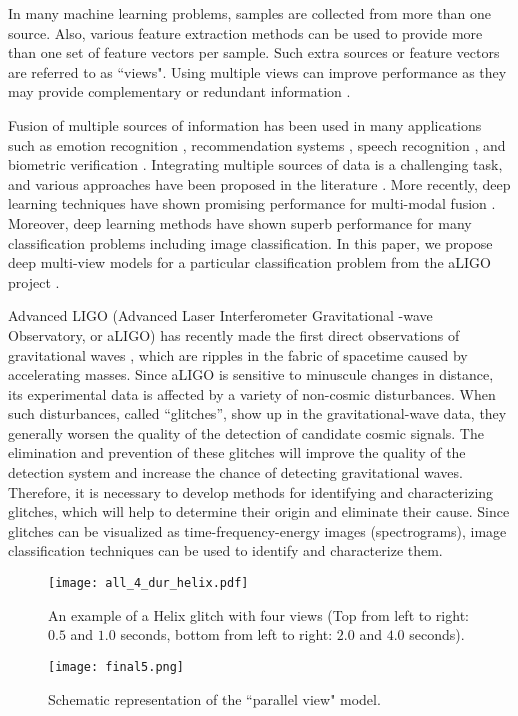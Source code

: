 \documentclass{article}
\begin{document}
In many machine learning problems, samples are collected from more than one source. Also, various feature extraction methods can be used to provide more than one set of feature vectors per sample. Such extra sources or feature vectors are referred to as ``views". Using multiple views can improve performance as they may provide complementary or redundant information \cite{xu2013survey}. 


Fusion of multiple sources of information has been used in many applications such as emotion recognition \cite{huang2016multi}, recommendation systems \cite{vahidrecomm}, speech recognition \cite{saraieee,bahaadini2014posterior}, and biometric verification \cite{aleksic2003audio}.
Integrating multiple sources of data is a challenging task, and various approaches have been proposed in the literature \cite{saraieee}\cite{7362367}. More recently, deep learning techniques have shown promising performance for multi-modal fusion \cite{srivastava2012multimodal,ngiam2011multimodal,suk2014hierarchical}. Moreover, deep learning methods have shown superb performance for many classification problems including image classification. In this paper, we propose deep multi-view models for a particular classification problem from the aLIGO project \cite{jointpaper}. %

Advanced LIGO (Advanced Laser Interferometer Gravitational -wave Observatory, or aLIGO) has recently made the first direct observations of gravitational waves \cite{GW150914} \cite{GW151226}, which are ripples in the fabric of spacetime caused by accelerating masses. Since aLIGO is sensitive to minuscule changes in distance, its experimental data is affected by a variety of non-cosmic disturbances. When such disturbances, called ``glitches'', show up in the gravitational-wave data, they generally worsen the quality of the detection of candidate cosmic signals. The elimination and prevention of these glitches will improve the quality of the detection system and increase the chance of detecting gravitational waves. Therefore, it is necessary to develop methods for identifying and characterizing glitches, which will help to determine their origin and eliminate their cause. Since glitches can be visualized as time-frequency-energy images (spectrograms), image classification techniques can be used to identify and characterize them. 
\begin{figure}[t!]
\centering
\texttt{[image: all\_4\_dur\_helix.pdf]}
\caption{An example of a Helix glitch with four views (Top from left to right: $0.5$ and $1.0$ seconds, bottom from left to right: $2.0$ and $4.0$ seconds).}
\label{fig:ex}
\end{figure}
\begin{figure*}[th!]
\centering
\texttt{[image: final5.png]}
\caption{Schematic representation of the ``parallel view" model.}
\label{fig:pview}

\end{figure*}
\end{document}
